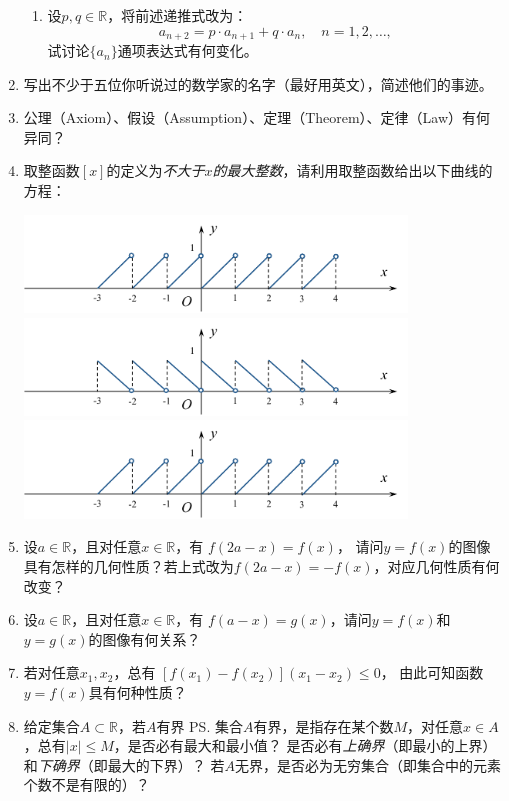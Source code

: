 \begin{enumerate}
\begin{enumerate}[(1)]
    \item 设$p,q\in\mathbb{R}$，将前述递推式改为：
    $$a_{n+2}=p\cdot a_{n+1}+q\cdot a_{n},\quad n=1,2,\ldots,$$
    试讨论$\{a_n\}$通项表达式有何变化。
  \end{enumerate}
  \item 写出不少于五位你听说过的数学家的名字（最好用英文），简述他们的事迹。
  \item 公理（Axiom）、假设（Assumption）、定理（Theorem）、定律（Law）有何异同？
  \item 取整函数$[x]$的定义为{\it 不大于$x$的最大整数}，请利用取整函数给出以下曲线的方程：
  \begin{center}
	\includegraphics[width=0.8\textwidth]{./images/ch00/selfTest/ST-Func1.pdf}\\
	\includegraphics[width=0.8\textwidth]{./images/ch00/selfTest/ST-Func2.pdf}\\
	\includegraphics[width=0.8\textwidth]{./images/ch00/selfTest/ST-Func1.pdf}
  \end{center}
  \item 设$a\in\mathbb{R}$，且对任意$x\in\mathbb{R}$，有
  $f(2a-x)=f(x)$，
  请问$y=f(x)$的图像具有怎样的几何性质？若上式改为$f(2a-x)=-f(x)$，对应几何性质有何改变？
  \item 设$a\in\mathbb{R}$，且对任意$x\in\mathbb{R}$，有
  $f(a-x)=g(x)$，请问$y=f(x)$和$y=g(x)$的图像有何关系？
  \item 若对任意$x_1,x_2$，总有
  $[f(x_1)-f(x_2)](x_1-x_2)\leq 0$，
  由此可知函数$y=f(x)$具有何种性质？
  \item 给定集合$A\subset\mathbb{R}$，若$A$有界
  \ps{集合$A$有界，是指存在某个数$M$，对任意$x\in A$，总有$|x|\leq M$}，是否必有最大和最小值？
  是否必有{\it 上确界}（即最小的上界）和{\it 下确界}（即最大的下界）？
  若$A$无界，是否必为无穷集合（即集合中的元素个数不是有限的）？
\end{enumerate}